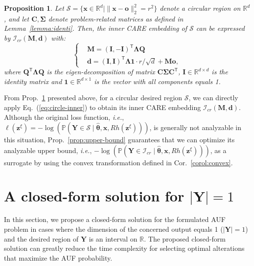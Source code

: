 \documentclass{article}
\theoremstyle{plain}
\newtheorem{proposition}[theorem]{Proposition}
\theoremstyle{definition}
\def \x {\mathbf{x}}
\def \I {\mathbf{I}}
\def \M {\mathbf{M}}
\def \o {\mathbf{o}}
\def \Y{\mathbf{Y}}
\def \ie {\textit{i.e.}}
\def \x {\mathbf{x}}
\def \sI {\mathcal{I}}
\def \sS {\mathcal{S}}
\def \Q {\mathbf{Q}}
\def \Y {\mathbf{Y}}
\def \I {\mathbf{I}}
\def \M {\mathbf{M}}
\def \C {\mathbf{C}}
\def \z {\mathbf{z}}
\def \d {\mathbf{d}}
\begin{document}
\begin{proposition}
\label{prop:inner4circle}
Let $\sS=\{\x\in\mathbb{R}^d\mid \|\x-\bm{o}\|_2^2 = r^2\}$ denote a circular region on $\mathbb{R}^d$, and let $\C,\bm{\Sigma}$ denote problem-related matrices as defined in Lemma~\ref{lemma:identi}. 
Then, the inner CARE embedding of $\sS$ can be expressed by $\sI_{cr}\left(\M, \d\right)$ with:
\begin{equation}
  \label{eq:circle-inner}
  \left\{
    \begin{aligned}
      &\M = (\I,-\I)^\mathsf{T}\bm{\Lambda}\Q\\
      &\d = (\I,\I)^\mathsf{T}\bm{\Lambda}\bm{1}\cdot r/\sqrt{d}+\M\o,
    \end{aligned}
  \right.
\end{equation}
\vskip -0.03in
where $\Q^\mathsf{T}\bm{\Lambda}\Q$ is the eigen-decomposition of matrix $\C\bm{\Sigma}\C^\mathsf{T}$, $\I\in\mathbb{R}^{d\times d}$ is the identity matrix and $\bm{1}\in\mathbb{R}^{d\times 1}$ is the vector with all components equals 1.
\end{proposition}

From Prop.~\ref{prop:inner4circle} presented above, for a circular desired region $\sS$, we can directly apply Eq.~(\ref{eq:circle-inner}) to obtain its inner CARE embedding $\sI_{cr}(\M,\d)$.
Although the original loss function, \ie, $\ell(\z^\xi)=-\log\left(\mathbb{P}(\Y \in \sS\mid \hat{\bm{\theta}}, \x, Rh(\z^\xi))\right)$, is generally not analyzable in this situation, 
Prop.~\ref{prop:upper-bound} guarantees that we can optimize its analyzable upper bound, \ie, $-\log\left(\mathbb{P}(\Y \in \sI_{cr}\mid \hat{\bm{\theta}}, \x, Rh(\z^\xi))\right)$, as a surrogate by using the convex transformation defined in Cor.~\ref{corol:convex}.

\section{A closed-form solution for $|\Y|=1$}
\label{sec:1d-close}
In this section, we propose a closed-form solution for the formulated AUF problem in cases where the dimension of the concerned output equals 1 ($|\Y|=1$) and the desired region of $\Y$ is an interval on $\mathbb{R}$. The proposed closed-form solution can greatly reduce the time complexity for selecting optimal alterations that maximize the AUF probability.
\end{document}
